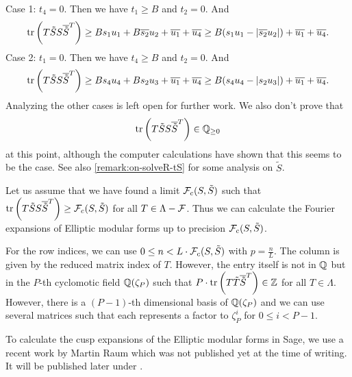 Case 1: $t_4 = 0$. Then we have $t_1 \ge B$ and $t_2 = 0$. And
\[ \textup{\textrm{tr}}\left(T \tilde{S} S \overline{\tilde{S}}^T\right) \ge
 B {s_{1}} u_{1} + {B \overline{s_{2}}} u_{2} + \overline{u_{1}} + \overline{u_{4}} \ge B(s_1 u_1 - |\overline{s_2} u_2 |) + \overline{u_1} + \overline{u_4} . \]
%
Case 2: $t_1 = 0$. Then we have $t_4 \ge B$ and $t_2 = 0$. And
\[ \textup{\textrm{tr}}\left(T \tilde{S} S \overline{\tilde{S}}^T\right) \ge
 B {s_4} u_4 + {B s_{2}} u_3 + \overline{u_{1}} + \overline{u_{4}} \ge B(s_4 u_4 - |s_2 u_3 |) + \overline{u_1} + \overline{u_4} . \]
%
Analyzing the other cases is left open for further work. We also don't prove that
\[ \textup{\textrm{tr}}\left(T \tilde{S} S \overline{\tilde{S}}^T\right) \in \mathbb{Q}_{\ge 0} \]
at this point, although the computer calculations have shown that this seems to be the case. See also \cref{remark:on-solveR-tS} for some analysis on $\tilde{S}$.

Let us assume that we have found a limit $\mathcal{F}_c(S,\tilde{S})$ such that $\textup{\textrm{tr}}\left(T \tilde{S} S \overline{\tilde{S}}^T\right) \ge \mathcal{F}_c(S,\tilde{S})$ for all $T \in \Lambda - \mathcal{F}$. Thus we can calculate the Fourier expansions of Elliptic modular forms up to precision $\mathcal{F}_c(S,\tilde{S})$.
%

For the row indices, we can use $0 \le n < L \cdot \mathcal{F}_c(S,\tilde{S})$ with $p = \frac{n}{L}$. The column is given by the reduced matrix index of $T$. However, the entry itself is not in $\mathbb{Q}$ but in the $P$-th cyclomotic field $\mathbb{Q}(\zeta_P)$ such that $P \cdot \textup{\textrm{tr}}\left(T \tilde{T} \overline{\tilde{S}}^T\right) \in \mathbb{Z}$ for all $T \in \Lambda$. However, there is a $(P-1)$-th dimensional basis of $\mathbb{Q}(\zeta_P)$ and we can use several matrices such that each represents a factor to $\zeta_P^i$ for $0 \le i < P - 1$.

To calculate the cusp expansions of the Elliptic modular forms in Sage, we use a recent work by Martin Raum which was not published yet at the time of writing. It will be published later under \cite{Raum13PSage}.



